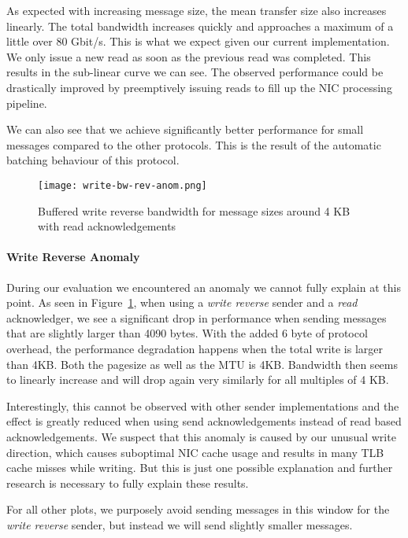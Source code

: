 As expected with increasing message size, the mean transfer size also increases linearly. The total bandwidth 
increases quickly and approaches a maximum of a little over 80 Gbit/s. This is what we expect given our current 
implementation. We only issue a new read as soon as the previous read was completed. This results in the sub-linear
curve we can see. The observed performance could be drastically improved by preemptively issuing reads to fill up
the NIC processing pipeline.

We can also see that we achieve significantly better performance for small messages compared to the other protocols. 
This is the result of the automatic batching behaviour of this protocol. 


\begin{figure}[h]
\texttt{[image: write-bw-rev-anom.png]}
\caption{Buffered write reverse bandwidth for message sizes around 4 KB with read acknowledgements}
\label{fig:plot-write-rev-anom}
\end{figure}

\paragraph{Write Reverse Anomaly} During our evaluation we encountered an anomaly we cannot fully explain at
this point. As seen in Figure~\ref{fig:plot-write-rev-anom}, when using a \emph{write reverse} sender and a 
\emph{read} acknowledger, we see a significant drop in performance when sending messages that are slightly larger
than 4090 bytes. 
With the added 6 byte of protocol overhead, the performance degradation happens when the total write is larger than 4KB.
Both the pagesize as well as the MTU is 4KB. Bandwidth then seems to linearly increase and will drop again very similarly 
for all multiples of 4 KB.

Interestingly, this cannot be observed with other sender implementations and the effect is greatly
reduced when using send acknowledgements instead of read based acknowledgements.
We suspect that this anomaly is caused by our unusual write direction, which causes suboptimal NIC cache usage and 
results in many TLB cache misses while writing. But this is just one possible explanation and further research is 
necessary to fully explain these results.

For all other plots, we purposely avoid sending messages in this window for the \emph{write reverse}
sender, but instead we will send slightly smaller messages.

